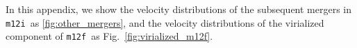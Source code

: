 \documentclass[twocolumn,preprintnumbers]{aastex6}
\DeclareRobustCommand{\Fig}[1]{Fig.~\ref{#1}}
\newcommand{\mi}{\texttt{m12i}}
\newcommand{\mf}{\texttt{m12f}}
\begin{document}
\clearpage
\def\bibsection{} 




\newpage

\onecolumngrid

\newpage
\appendix

\setcounter{equation}{0}
\setcounter{figure}{0}
\setcounter{table}{0}
\setcounter{section}{0}
\makeatletter
\renewcommand{\theequation}{S\arabic{equation}}
\renewcommand{\thefigure}{S\arabic{figure}}
\renewcommand{\thetable}{S\arabic{table}}


In this appendix, we show the velocity distributions of the subsequent mergers in \mi~as \ref{fig:other_mergers}, and
 the velocity distributions of the virialized component of \mf~as \Fig{fig:virialized_m12f}.



%
\end{document}
